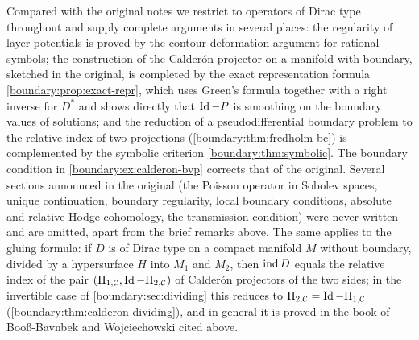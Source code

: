 Compared with the original notes we restrict to operators of Dirac type throughout and
supply complete arguments in several places: the regularity of layer potentials is proved
by the contour-deformation argument for rational symbols; the construction of the
Calder\'on projector on a manifold with boundary, sketched in the original, is completed
by the exact representation formula \cref{boundary:prop:exact-repr}, which uses Green's
formula together with a right inverse for $D^*$ and shows directly that $\operatorname{Id}-P$ is
smoothing on the boundary values of solutions; and the reduction of a pseudodifferential
boundary problem to the relative index of two projections
(\cref{boundary:thm:fredholm-bc}) is complemented by the symbolic criterion
\cref{boundary:thm:symbolic}. The boundary condition in \cref{boundary:ex:calderon-bvp}
corrects that of the original. Several sections announced in the original (the Poisson
operator in Sobolev spaces, unique continuation, boundary regularity, local boundary
conditions, absolute and relative Hodge cohomology, the transmission condition) were never
written and are omitted, apart from the brief remarks above. The same applies to the
gluing formula: if $D$ is of Dirac type on a compact manifold $M$ without boundary,
divided by a hypersurface $H$ into $M_1$ and $M_2$, then $\operatorname{ind} D$ equals the relative index
of the pair $(\Pi_{1,\mathcal C},\operatorname{Id}-\Pi_{2,\mathcal C})$ of Calder\'on projectors of the
two sides; in the invertible case of \cref{boundary:sec:dividing} this reduces to
$\Pi_{2,\mathcal C}=\operatorname{Id}-\Pi_{1,\mathcal C}$ (\cref{boundary:thm:calderon-dividing}), and
in general it is proved in the book of Boo{\ss}-Bavnbek and Wojciechowski cited above.
